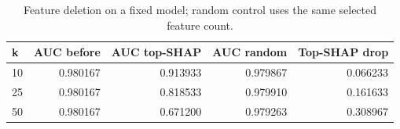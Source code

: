 \begin{table}[htbp]
\centering
\small
\caption{Feature deletion on a fixed model; random control uses the same selected feature count.}
\begin{tabular}{lrrrr}
\toprule
k & AUC before & AUC top-SHAP & AUC random & Top-SHAP drop \\
\midrule
10 & 0.980167 & 0.913933 & 0.979867 & 0.066233 \\
25 & 0.980167 & 0.818533 & 0.979910 & 0.161633 \\
50 & 0.980167 & 0.671200 & 0.979263 & 0.308967 \\
\bottomrule
\end{tabular}
\end{table}
